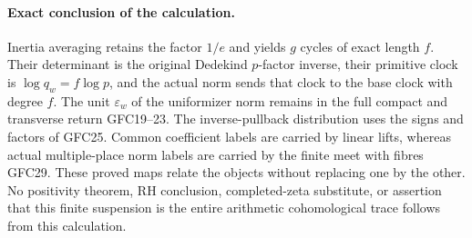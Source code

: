 \paragraph{Exact conclusion of the calculation.}
Inertia averaging retains the factor $1/e$ and yields $g$ cycles
of exact length $f$. Their determinant is the original Dedekind
$p$-factor inverse, their primitive clock is $\log q_w=f\log p$,
and the actual norm sends that clock to the base clock with
degree $f$. The unit $\varepsilon_w$ of the uniformizer norm
remains in the full compact and transverse return GFC19--23.
The inverse-pullback distribution uses the signs and factors
of GFC25. Common coefficient labels are carried by linear lifts,
whereas actual multiple-place norm labels are carried by the
finite meet with fibres GFC29. These proved maps relate the
objects without replacing one by the other. No positivity
theorem, RH conclusion, completed-zeta substitute, or assertion
that this finite suspension is the entire arithmetic
cohomological trace follows from this calculation.
